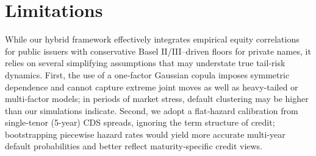 \documentclass[
	a4paper,         %
	12pt,            %
	unnumberedsections,  %
	twoside,         %
]{LTJournalArticle}
\begin{document}
\begin{table}[ht]

  \centering
  \caption{Tranche Fair Spreads under Uniform Correlation Bumps}
  \label{tab:corr_bump_values}
\end{table}

\section{Limitations}

While our hybrid framework effectively integrates empirical equity correlations for public issuers with conservative Basel II/III–driven floors for private names, it relies on several simplifying assumptions that may understate true tail‐risk dynamics. First, the use of a one‐factor Gaussian copula imposes symmetric dependence and cannot capture extreme joint moves as well as heavy‐tailed or multi‐factor models; in periods of market stress, default clustering may be higher than our simulations indicate.  Second, we adopt a flat‐hazard calibration from single‐tenor (5-year) CDS spreads, ignoring the term structure of credit; bootstrapping piecewise hazard rates would yield more accurate multi‐year default probabilities and better reflect maturity‐specific credit views.
\end{document}

